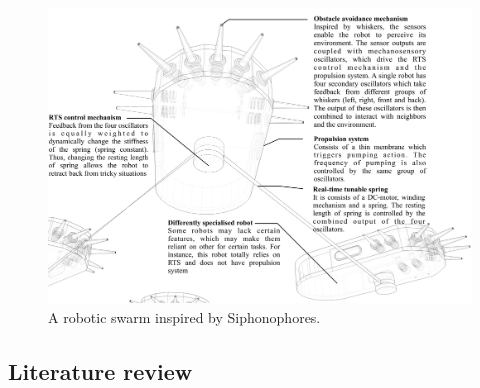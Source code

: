 \documentclass[11pt,a4paper]{article}
\begin{document}
\begin{figure}[htbp]
\centering
\includegraphics{images/robot design}
\caption{A robotic swarm inspired by Siphonophores.}
\end{figure}
\begin{center}
\section{Literature review}\label{literature}
\end{center}
\end{document}
